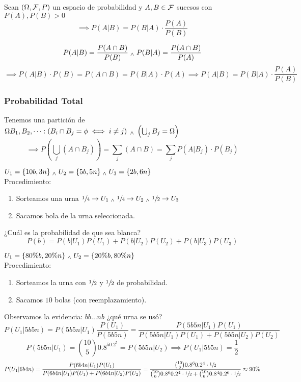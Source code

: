 \begin{prop}
	Sean $(\Omega, \mathcal{F}, P)$ un espacio de probabilidad y $A, B \in \mathcal{F}$ sucesos con $P(A), P(B)>0$
	\[\implies P(A|B)=P(B|A)\cdot \frac{P(A)}{P(B)}\]
	\begin{dem}
		\[P(A|B)=\frac{P(A\cap B)}{P(B)} \; _{\wedge} \; P(B|A)=\frac{P(A\cap B)}{P(A)}\]
		\[\implies P(A|B)\cdot P(B) = P(A\cap B) = P(B|A)\cdot P(A) \implies P(A|B)=P(B|A)\cdot \frac{P(A)}{P(B)}\]
	\end{dem}
\end{prop}

\subsubsection{Probabilidad Total}
Tenemos una partición de $\Omega B_1, B_2, \dots : \left(B_i\cap B_j = \phi \iff i\ne j\right) \; _{\wedge} \; \left(\bigcup_jB_j=\Omega\right)$
\[\implies P\left(\bigcup_j(A\cap B_j)\right)=\sum_j(A\cap B)=\sum_jP(A|B_j)\cdot P(B_j)\]

\begin{ejem}
	$U_1=\{10b, 3n\} \; _{\wedge} \; U_2=\{5b, 5n\} \; _{\wedge} \; U_3=\{2b, 6n\}$ \\
	Procedimiento:
	\begin{enumerate}
		\item Sorteamos una urna $\sfrac{1}{4} \rightarrow U_1 \; _{\wedge} \; \sfrac{1}{4} \rightarrow U_2 \; _{\wedge} \; \sfrac{1}{2} \rightarrow U_3$
		\item Sacamos bola de la urna seleccionada.
	\end{enumerate}
	¿Cuál es la probabilidad de que sea blanca?
	\[P(b)=P(b|U_1)P(U_1)+P(b|U_2)P(U_2)+P(b|U_3)P(U_3)\]
\end{ejem}

\begin{ejem}
	$U_1=\{80\%b, 20\%n\} \; _{\wedge} \; U_2=\{20\%b, 80\%n\}$ \\
	Procedimiento:
	\begin{enumerate}
		\item Sorteamos la urna con $\sfrac{1}{2}$ y $\sfrac{1}{2}$ de probabilidad.
		\item Sacamos $10$ bolas (con reemplazamiento).
	\end{enumerate}
	Observamos la evidencia: $bb\dots nb$ ¿qué urna se usó?
	\[P(U_1|5b5n)=P(5b5n|U_1)\frac{P(U_1)}{P(5b5n)}=\frac{P(5b5n|U_1)P(U_1)}{P(5b5n|U_1)P(U_1)+P(5b5n|U_2)P(U_2)}\]
	\[P(5b5n|U_1)=\binom{10}{5}0.8^50.2^5=P(5b5n|U_2) \implies P(U_1|5b5n)=\frac{1}{2}\]
	\[P(U_1|6b4n)=\frac{P(6b4n|U_1)P(U_1)}{P(6b4n|U_1)P(U_1)+P(6b4n|U_2)P(U_2)} = \frac{\binom{10}{6}0.8^60.2^4\cdot\sfrac{1}{2}}{\binom{10}{6}0.8^60.2^4\cdot\sfrac{1}{2} + \binom{10}{6}0.8^40.2^6\cdot\sfrac{1}{2}}\approx90\%\]
\end{ejem}

